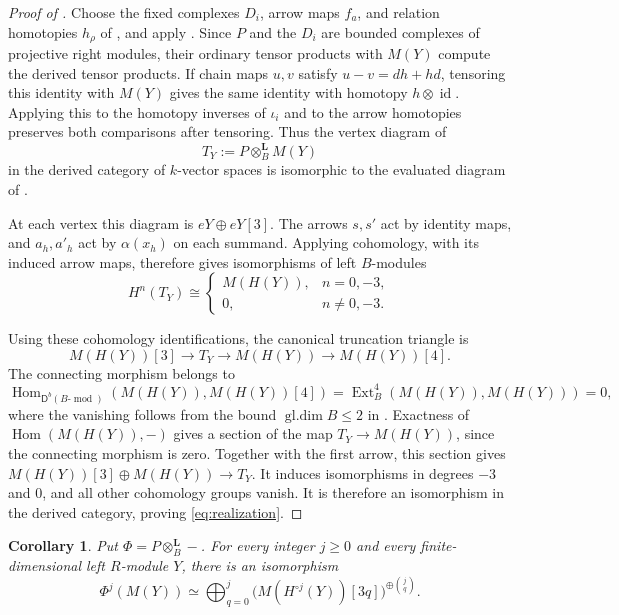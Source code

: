 \documentclass[11pt]{article}
\numberwithin{equation}{section}
\newtheorem{corollary}[theorem]{Corollary}
\theoremstyle{definition}
\theoremstyle{remark}
\newcommand{\D}{\mathsf D}
\newcommand{\otL}{\otimes^{\mathbf L}}
\DeclareMathOperator{\Hom}{Hom}
\DeclareMathOperator{\Ext}{Ext}
\DeclareMathOperator{\gldim}{gl.dim}
\DeclareMathOperator{\id}{id}
\DeclareMathOperator{\modu}{mod}
\begin{document}
\begin{proof}[Proof of ]
Choose the fixed complexes \(D_i\), arrow maps \(f_a\), and relation
homotopies \(h_\rho\) of , and apply
.  Since \(P\) and the \(D_i\) are bounded
complexes of projective right modules, their ordinary tensor
products with \(M(Y)\) compute the derived tensor products.
If chain maps $u,v$ satisfy $u-v=dh+hd$, tensoring this identity
with $M(Y)$ gives the same identity with homotopy $h\otimes\id$.
Applying this to the homotopy inverses of $\iota_i$ and to the arrow
homotopies preserves both comparisons after tensoring.  Thus the vertex diagram of
\[
 T_Y:=P\otL_B M(Y)
\]
in the derived category of \(k\)-vector spaces is isomorphic to the
evaluated diagram of .

At each vertex this diagram is \(eY\oplus eY[3]\).  The arrows
\(s,s'\) act by identity maps, and \(a_h,a'_h\) act by
\(\alpha(x_h)\) on each summand.  Applying cohomology, with its
induced arrow maps, therefore gives isomorphisms of left
\(B\)-modules
\[
 H^n(T_Y)\cong
 \begin{cases}
  M(H(Y)),& n=0,-3,\\
  0,& n\ne0,-3.
 \end{cases}
\]


Using these cohomology identifications, the canonical truncation
triangle is
\[
 M(H(Y))[3]\longrightarrow T_Y\longrightarrow M(H(Y))
 \longrightarrow M(H(Y))[4].
\]
The connecting morphism belongs to
\[
 \Hom_{\D^b(B\text{-}\modu)}(M(H(Y)),M(H(Y))[4])
   =\Ext_B^4(M(H(Y)),M(H(Y)))=0,
\]
where the vanishing follows from the bound
\(\gldim B\leq2\) in .
Exactness of $\Hom(M(H(Y)),-)$ gives a section of the map
$T_Y\to M(H(Y))$, since the connecting morphism is zero. Together
with the first arrow, this section gives
$M(H(Y))[3]\oplus M(H(Y))\to T_Y$. It induces isomorphisms in
degrees $-3$ and $0$, and all other cohomology groups vanish.
It is therefore an isomorphism in the derived category, proving
\eqref{eq:realization}.

\end{proof}

\begin{corollary}
Put \(\Phi=P\otL_B-\).  For every integer \(j\geq0\) and every
finite-dimensional left \(R\)-module \(Y\), there is an isomorphism
\[
 \Phi^j(M(Y))
 \simeq
 \bigoplus_{q=0}^j
   \bigl(M(H^{\circ j}(Y))[3q]\bigr)^{\oplus\binom{j}{q}} .
\]
\end{corollary}
\end{document}
